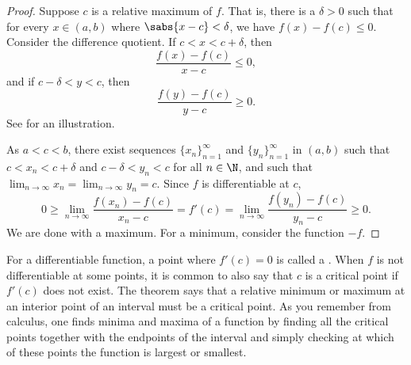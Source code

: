 \begin{proof}
Suppose $c$ is a 
relative maximum of $f$.  That is, there is a $\delta > 0$ such
that for every $x \in (a,b)$ where
$\sabs{x-c} < \delta$, we have $f(x)-f(c) \leq 0$.
Consider the difference
quotient.  If $c < x < c+\delta$, then
\begin{equation*}
\frac{f(x)-f(c)}{x-c} \leq 0 ,
\end{equation*}
and if $c-\delta < y < c$, then
\begin{equation*}
\frac{f(y)-f(c)}{y-c} \geq 0 .
\end{equation*}
See  for an illustration.
\begin{myfigureht}
\caption{Slopes of secants at a relative maximum.\label{fig:critpt}}
\end{myfigureht}

As $a < c < b$, there exist
sequences $\{ x_n \}_{n=1}^\infty$ and
$\{ y_n \}_{n=1}^\infty$ in $(a,b)$
such that $c < x_n < c+\delta$ and
$c-\delta < y_n < c$ for all $n \in \N$, and such that
$\lim_{n\to\infty} x_n = \lim_{n\to\infty} y_n = c$.
Since $f$
is differentiable at $c$,
\begin{equation*}
0 \geq \lim_{n\to\infty} \frac{f(x_n)-f(c)}{x_n-c} 
=
f'(c)
=
\lim_{n\to\infty} \frac{f(y_n)-f(c)}{y_n-c} \geq 0.
\end{equation*}
We are done with a maximum.
For a minimum, consider
the function $-f$.
\end{proof}

For a differentiable function, a point where 
$f'(c) = 0$ is called a \emph{}.  When $f$ is not
differentiable at some points,
it is common to also say that $c$ is a critical point
if $f'(c)$ does not exist.
The theorem says that a relative minimum or maximum at an interior point
of an interval must be a critical point.
As you remember from calculus, one finds minima and maxima of a function
by finding all the critical points together with the endpoints of
the interval and simply checking at which of these points
the function is largest or smallest.

